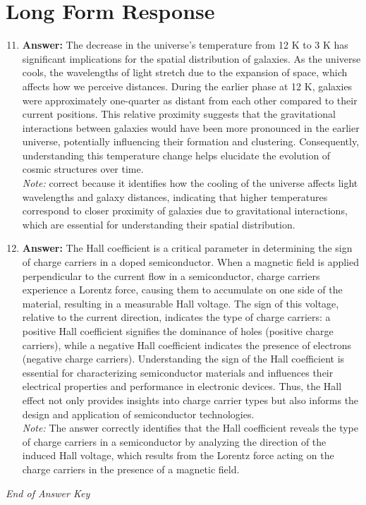 \documentclass[12pt]{article}
\begin{document}
\section*{Long Form Response}
\begin{enumerate}[label=\arabic*.]
\setcounter{enumi}{10}
\item \textbf{Answer:} The decrease in the universe's temperature from 12 K to 3 K has significant implications for the spatial distribution of galaxies. As the universe cools, the wavelengths of light stretch due to the expansion of space, which affects how we perceive distances. During the earlier phase at 12 K, galaxies were approximately one-quarter as distant from each other compared to their current positions. This relative proximity suggests that the gravitational interactions between galaxies would have been more pronounced in the earlier universe, potentially influencing their formation and clustering. Consequently, understanding this temperature change helps elucidate the evolution of cosmic structures over time.
\\ \textit{Note:} correct because it identifies how the cooling of the universe affects light wavelengths and galaxy distances, indicating that higher temperatures correspond to closer proximity of galaxies due to gravitational interactions, which are essential for understanding their spatial distribution.
\item \textbf{Answer:} The Hall coefficient is a critical parameter in determining the sign of charge carriers in a doped semiconductor. When a magnetic field is applied perpendicular to the current flow in a semiconductor, charge carriers experience a Lorentz force, causing them to accumulate on one side of the material, resulting in a measurable Hall voltage. The sign of this voltage, relative to the current direction, indicates the type of charge carriers: a positive Hall coefficient signifies the dominance of holes (positive charge carriers), while a negative Hall coefficient indicates the presence of electrons (negative charge carriers). Understanding the sign of the Hall coefficient is essential for characterizing semiconductor materials and influences their electrical properties and performance in electronic devices. Thus, the Hall effect not only provides insights into charge carrier types but also informs the design and application of semiconductor technologies.
\\ \textit{Note:} The answer correctly identifies that the Hall coefficient reveals the type of charge carriers in a semiconductor by analyzing the direction of the induced Hall voltage, which results from the Lorentz force acting on the charge carriers in the presence of a magnetic field.
\end{enumerate}

\vfill
\noindent\textit{End of Answer Key}
\end{document}
